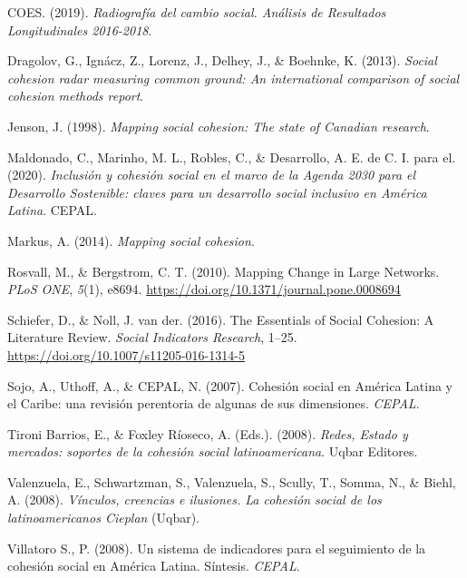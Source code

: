 \documentclass[
  12pt,
]{book}
\begin{document}
\leavevmode\hypertarget{ref-coes_radiografia_2019}{}%
COES. (2019). \emph{Radiografía del cambio social. Análisis de Resultados Longitudinales 2016-2018}.

\leavevmode\hypertarget{ref-dragolov_social_2013}{}%
Dragolov, G., Ignácz, Z., Lorenz, J., Delhey, J., \& Boehnke, K. (2013). \emph{Social cohesion radar measuring common ground: An international comparison of social cohesion methods report}.

\leavevmode\hypertarget{ref-jenson_mapping_1998}{}%
Jenson, J. (1998). \emph{Mapping social cohesion: The state of Canadian research}.

\leavevmode\hypertarget{ref-maldonado_inclusion_2020}{}%
Maldonado, C., Marinho, M. L., Robles, C., \& Desarrollo, A. E. de C. I. para el. (2020). \emph{Inclusión y cohesión social en el marco de la Agenda 2030 para el Desarrollo Sostenible: claves para un desarrollo social inclusivo en América Latina}. CEPAL.

\leavevmode\hypertarget{ref-markus_mapping_2014}{}%
Markus, A. (2014). \emph{Mapping social cohesion}.

\leavevmode\hypertarget{ref-rosvall_mapping_2010}{}%
Rosvall, M., \& Bergstrom, C. T. (2010). Mapping Change in Large Networks. \emph{PLoS ONE}, \emph{5}(1), e8694. \url{https://doi.org/10.1371/journal.pone.0008694}

\leavevmode\hypertarget{ref-schiefer_essentials_2016}{}%
Schiefer, D., \& Noll, J. van der. (2016). The Essentials of Social Cohesion: A Literature Review. \emph{Social Indicators Research}, 1--25. \url{https://doi.org/10.1007/s11205-016-1314-5}

\leavevmode\hypertarget{ref-sojo_cohesion_2007}{}%
Sojo, A., Uthoff, A., \& CEPAL, N. (2007). Cohesión social en América Latina y el Caribe: una revisión perentoria de algunas de sus dimensiones. \emph{CEPAL}.

\leavevmode\hypertarget{ref-tironibarrios_redes_2008}{}%
Tironi Barrios, E., \& Foxley Ríoseco, A. (Eds.). (2008). \emph{Redes, Estado y mercados: soportes de la cohesión social latinoamericana}. Uqbar Editores.

\leavevmode\hypertarget{ref-valenzuela_vinculos_2008}{}%
Valenzuela, E., Schwartzman, S., Valenzuela, S., Scully, T., Somma, N., \& Biehl, A. (2008). \emph{Vínculos, creencias e ilusiones. La cohesión social de los latinoamericanos Cieplan} (Uqbar).

\leavevmode\hypertarget{ref-villatoros._sistema_2008}{}%
Villatoro S., P. (2008). Un sistema de indicadores para el seguimiento de la cohesión social en América Latina. Síntesis. \emph{CEPAL}.
\end{document}
